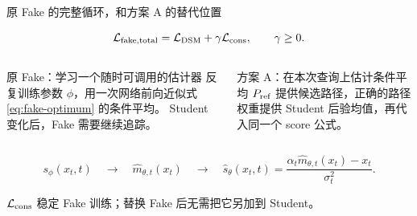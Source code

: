 \documentclass[10pt,aspectratio=169]{beamer}
\newcommand{\sourceline}[1]{\par{\scriptsize\color{gray}#1}\par}
\begin{document}
\begin{frame}{原 Fake 的完整循环，和方案 A 的替代位置}
\small
\begin{center}
\end{center}
\begin{equation}\label{eq:fake-total}
\mathcal L_{\rm fake,total}=\mathcal L_{\rm DSM}+\gamma\mathcal L_{\rm cons},
\qquad\gamma\geq0.
\end{equation}
\begin{columns}[T,onlytextwidth]
\begin{block}{原 Fake：学习一个随时可调用的估计器}
反复训练参数 $\phi$，用一次网络前向近似式 \eqref{eq:fake-optimum} 的条件平均。
Student 变化后，Fake 需要继续追踪。
\end{block}
\begin{exampleblock}{方案 A：在本次查询上估计条件平均}
\ensuremath{P_{\rm ref}} 提供候选路径，正确的路径权重提供 Student 后验均值，再代入同一个 score 公式。
\end{exampleblock}
\end{columns}
\begin{equation}\label{eq:replacement-interface}
s_\phi(x_t,t)\quad\longrightarrow\quad
\widehat m_{\theta,t}(x_t)\quad\longrightarrow\quad
\widehat s_\theta(x_t,t)=\frac{\alpha_t\widehat m_{\theta,t}(x_t)-x_t}{\sigma_t^2}.
\end{equation}
\sourceline{$\mathcal L_{\rm cons}$ 稳定 Fake 训练；替换 Fake 后无需把它另加到 Student。}
\end{frame}
\end{document}
